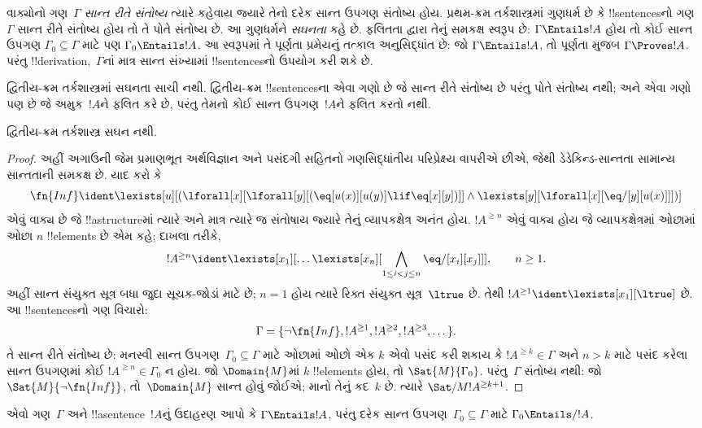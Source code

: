 \documentclass[../../../include/open-logic-section]{subfiles}
\begin{document}


\begin{explain}
વાક્યોનો ગણ~$\Gamma$ \emph{સાન્ત રીતે સંતોષ્ય} ત્યારે કહેવાય જ્યારે
તેનો દરેક સાન્ત ઉપગણ સંતોષ્ય હોય. પ્રથમ-ક્રમ તર્કશાસ્ત્રમાં ગુણધર્મ છે
કે !!{sentence}sનો ગણ~$\Gamma$ સાન્ત રીતે સંતોષ્ય હોય તો તે પોતે
સંતોષ્ય છે. આ ગુણધર્મને \emph{સઘનતા} કહે છે. ફલિતતા દ્વારા તેનું
સમકક્ષ સ્વરૂપ છે: $\Gamma \Entails !A$ હોય તો કોઈ સાન્ત ઉપગણ
$\Gamma_0 \subseteq \Gamma$ માટે પણ $\Gamma_0 \Entails
!A$. આ સ્વરૂપમાં તે પૂર્ણતા પ્રમેયનું તત્કાલ અનુસિદ્ધાંત છે: જો
$\Gamma \Entails !A$, તો પૂર્ણતા મુજબ $\Gamma \Proves !A$. પરંતુ
!!{derivation},~$\Gamma$નાં માત્ર સાન્ત સંખ્યામાં !!{sentence}sનો
ઉપયોગ કરી શકે છે.

દ્વિતીય-ક્રમ તર્કશાસ્ત્રમાં સઘનતા સાચી નથી. દ્વિતીય-ક્રમ
!!{sentence}sના એવા ગણો છે જે સાન્ત રીતે સંતોષ્ય છે પરંતુ પોતે
સંતોષ્ય નથી; અને એવા ગણો પણ છે જે અમુક~$!A$ને ફલિત કરે છે,
પરંતુ તેમનો કોઈ સાન્ત ઉપગણ~$!A$ને ફલિત કરતો નથી.
\end{explain}


\begin{thm}
દ્વિતીય-ક્રમ તર્કશાસ્ત્ર સઘન નથી.
\end{thm}

\begin{proof}
અહીં અગાઉની જેમ પ્રમાણભૂત અર્થવિજ્ઞાન અને પસંદગી સહિતનો
ગણસિદ્ધાંતીય પરિપ્રેક્ષ્ય વાપરીએ છીએ, જેથી ડેડેકિન્ડ-સાન્તતા
સામાન્ય સાન્તતાની સમકક્ષ છે.
યાદ કરો કે
\[
\fn{Inf} \ident \lexists[u][(\lforall[x][\lforall[y][(\eq[u(x)][u(y)]
      \lif \eq[x][y])]] \land \lexists[y][\lforall[x][\eq/[y][u(x)]]])]
\]
એવું વાક્ય છે જે !!a{structure}માં ત્યારે અને માત્ર ત્યારે જ
સંતોષાય જ્યારે તેનું વ્યાપકક્ષેત્ર અનંત હોય. $!A^{\ge n}$ એવું
વાક્ય હોય જે વ્યાપકક્ષેત્રમાં ઓછામાં ઓછા $n$ !!{element}s છે એમ કહે;
દાખલા તરીકે,
\[
!A^{\ge n} \ident \lexists[x_1][\dots\lexists[x_n][
  \bigwedge_{1\le i<j\le n}\eq/[x_i][x_j]]], \qquad n\ge1.
\]
અહીં સાન્ત સંયુક્ત સૂત્ર બધા જુદા સૂચક-જોડાં માટે છે; $n=1$
હોય ત્યારે રિક્ત સંયુક્ત સૂત્ર~$\ltrue$ છે. તેથી
$!A^{\ge1}\ident\lexists[x_1][\ltrue]$ છે.
આ !!{sentence}sનો ગણ વિચારો:
\[
\Gamma = \{\lnot \fn{Inf}, !A^{\ge 1}, !A^{\ge 2}, !A^{\ge 3}, \dots\}.
\]
તે સાન્ત રીતે સંતોષ્ય છે: મનસ્વી સાન્ત ઉપગણ~$\Gamma_0
\subseteq \Gamma$ માટે ઓછામાં ઓછો એક $k$ એવો પસંદ કરી શકાય કે
$!A^{\ge k} \in \Gamma$ અને $n>k$ માટે પસંદ કરેલા સાન્ત ઉપગણમાં
કોઈ $!A^{\ge n}
\in \Gamma_0$ ન હોય. જો $\Domain{M}$માં $k$ !!{element}s હોય,
તો $\Sat{M}{\Gamma_0}$. પરંતુ~$\Gamma$ સંતોષ્ય નથી: જો
$\Sat{M}{\lnot \fn{Inf}}$, તો~$\Domain{M}$ સાન્ત હોવું જોઈએ;
માનો તેનું કદ~$k$ છે. ત્યારે $\Sat/{M}{!A^{\ge k+1}}$.
\end{proof}

\begin{prob}
એવો ગણ~$\Gamma$ અને !!a{sentence}~$!A$નું ઉદાહરણ આપો કે
$\Gamma \Entails !A$, પરંતુ દરેક સાન્ત ઉપગણ~$\Gamma_0 \subseteq
\Gamma$ માટે $\Gamma_0 \Entails/ !A$.
\end{prob}
\end{document}
